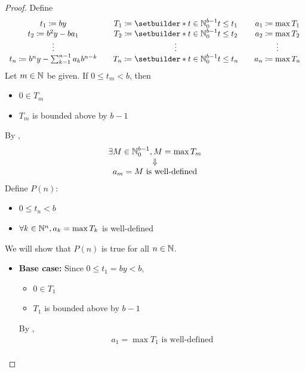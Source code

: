 \begin{proof}
    Define
    \[
    \begin{array}{c@{\qquad}c@{\qquad}c}
        t_{1} \coloneqq by & T_{1} \coloneqq \setbuilder*{t \in \N_{0}^{b - 1}}{t \leq t_{1}} &
        a_{1} \coloneqq \max T_{1} \\
        t_{2} \coloneqq b^{2}y - ba_{1} & T_{2} \coloneqq \setbuilder*{t \in \N_{0}^{b - 1}}{t \leq t_{2}} &
        a_{2} \coloneqq \max T_{2} \\
        \vdots & \vdots & \vdots \\
        t_{n} \coloneqq b^{n}y - \sum_{k = 1}^{n - 1} a_{k}b^{n - k} &
        T_{n} \coloneqq \setbuilder*{t \in \N_{0}^{b - 1}}{t \leq t_{n}} & a_{n} \coloneqq \max T_{n}
    \end{array}
    \]
    Let $m \in \mathbb{N}$ be given. If $0 \leq t_{m} < b$, then
    \begin{itemize}
        \item $0 \in T_{m}$
        \item $T_{m}$ is bounded above by $b - 1$
    \end{itemize}
    By ,
    \[
    \begin{array}{c}
        \exists M \in \mathbb{N}_{0}^{b - 1}, M = \max T_{m} \\
        \Downarrow \\
        a_{m} = M \text{ is well-defined}
    \end{array}
    \]
    Define $P(n):$
    \begin{itemize}
        \item $0 \leq t_{n} < b$
        \item $\forall k \in \mathbb{N}^{n}, a_{k} = \max T_{k}$ is well-defined
    \end{itemize}
    We will show that $P(n)$ is true for all $n \in \mathbb{N}$.
    \begin{itemize}
        \item \textbf{Base case:} Since $0 \leq t_{1} = by < b$,
        \begin{itemize}
            \item $0 \in T_{1}$
            \item $T_{1}$ is bounded above by $b - 1$
        \end{itemize}
        By ,
        \[
        \begin{array}{c}
            a_{1} = \max T_{1} \text{ is well-defined} \\

\end{array}\]
\end{itemize}
\end{proof}
